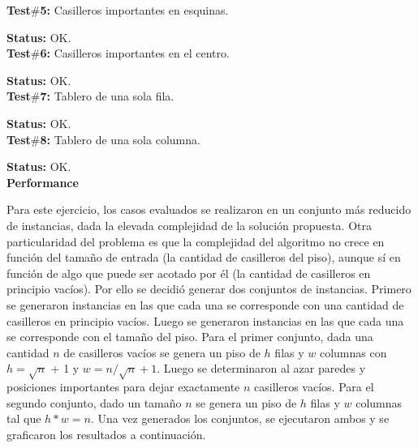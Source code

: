 {\newpage
\noindent\textbf{Test$\#$5:} Casilleros importantes en esquinas.
\begin{figure}[H]
\centering
\def\svgwidth{140 pt}

\end{figure}
\noindent\textbf{Status:} OK.\\

\noindent\textbf{Test$\#$6:} Casilleros importantes en el centro.\\
\begin{figure}[H]
\centering
\def\svgwidth{140 pt}

\end{figure}
\noindent\textbf{Status:} OK.\\

\noindent\textbf{Test$\#$7:} Tablero de una sola fila.\\
\begin{figure}[H]
\centering
\def\svgwidth{140 pt}

\end{figure}
\noindent\textbf{Status:} OK.\\

\noindent\textbf{Test$\#$8:} Tablero de una sola columna.\\
\begin{figure}[H]
\centering
\def\svgwidth{140 pt}

\end{figure}
\noindent\textbf{Status:} OK.\\


\newpage
\textbf{Performance}\\
\par{Para este ejercicio, los casos evaluados se realizaron en un conjunto m\'as reducido de instancias, dada la elevada complejidad de la soluci\'on propuesta. Otra particularidad del problema es que la complejidad del algoritmo no crece en funci\'on del tama\~no de entrada (la cantidad de casilleros del piso), aunque s\'i en funci\'on de algo que puede ser acotado por \'el (la cantidad de casilleros en principio vac\'ios). Por ello se decidi\'o generar dos conjuntos de instancias. Primero se generaron instancias en las que cada una se corresponde con una cantidad de casilleros en principio vac\'ios. Luego se generaron instancias en las que cada una se corresponde con el tama\~no del piso. Para el primer conjunto, dada una cantidad $n$ de casilleros vac\'ios se genera un piso de $h$ filas y $w$ columnas con $h = \sqrt{n}$ + 1} y $w = n / \sqrt{n} +1$. Luego se determinaron al azar paredes y posiciones importantes para dejar exactamente $n$ casilleros vac\'ios. Para el segundo conjunto, dado un tama\~no $n$ se genera un piso de $h$ filas y $w$ columnas tal que $h*w = n$. Una vez generados los conjuntos, se ejecutaron ambos y se graficaron los resultados a continuaci\'on.}
